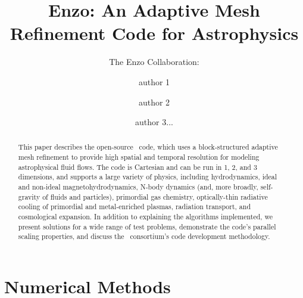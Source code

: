 \documentclass[onecolumn]{emulateapj}  %
\begin{document}
\title{Enzo: An Adaptive Mesh Refinement Code for Astrophysics}
\author{The Enzo Collaboration:}
\author{author 1}
\author{author 2}
\author{author 3...}


\begin{abstract}
This paper describes the open-source \enzo\ code, which uses a
block-structured adaptive mesh refinement to provide high spatial and
temporal resolution for modeling astrophysical fluid flows.  The code
is Cartesian and can be run in 1, 2, and 3 dimensions, and supports a
large variety of physics, including hydrodynamics, ideal and non-ideal
magnetohydrodynamics, N-body dynamics (and, more broadly, self-gravity
of fluids and particles), primordial gas chemistry, optically-thin
radiative cooling of primordial and metal-enriched plasmas, radiation
transport, and cosmological expansion.  In addition to explaining the
algorithms implemented, we present solutions for a wide range of test
problems, demonstrate the code's parallel scaling properties, and
discuss the \enzo\ consortium's code development methodology.
\end{abstract}


\maketitle





\section{Numerical Methods}
\label{sec.methods}
\end{document}
